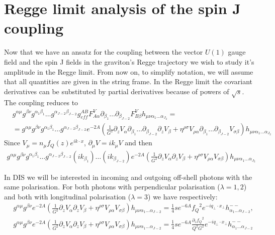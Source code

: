 \documentclass[a4paper,12pt]{article}
\begin{document}
\section{Regge limit analysis of the spin J coupling}
Now that we have an ansatz for the coupling between the vector $U(1)$ gauge field and the spin J fields in the graviton's Regge trajectory we wish to study it's amplitude in the Regge limit. From now on, to simplify notation, we will assume that all quantities are given in the string frame. In the Regge limit the covariant derivatives can be substituted by partial derivatives because of powers of $\sqrt{s}$. The coupling reduces to
\begin{align}
&g^{\alpha \mu} g^{\beta \nu} g^{\alpha_1 \beta_1} \dots g^{\alpha_{J-2} \beta_{J-2}} g^{AB}_{eff} F^{V}_{A \alpha} \partial_{\beta_1} \dots \partial_{\beta_{J-2}} F^{V}_{B \beta} h_{\mu \nu \alpha_1 \dots \alpha_{J_2}} = \\
& = g^{\alpha \mu} g^{\beta \nu} g^{\alpha_1 \beta_1} \dots g^{\alpha_{J-2} \beta_{J-2}} e^{-2A} \left( \frac{1}{G^2} \partial_z V_\alpha \partial_{\beta_1} \dots \partial_{\beta_{J-2}} \partial_z V_\beta + \eta^{\rho \sigma} V_{\rho \alpha} \partial_{\beta_1} \dots \partial_{\beta_{J-2}} V_{\sigma \beta} \right) h_{\mu \nu \alpha_1 \dots \alpha_{J_2}}
\end{align}
Since $V_\mu = n_\mu f_Q \left( z\right) e^{i k \cdot x}$, $\partial_\mu V = i k_\mu V$ and then
\begin{align}
g^{\alpha \mu} g^{\beta \nu} g^{\alpha_1 \beta_1} \dots g^{\alpha_{J-2} \beta_{J-2}} \left( i k_{\beta_1}\right) \dots  \left( i k_{\beta_{J-2}}\right) e^{-2A} \left( \frac{1}{G^2} \partial_z V_\alpha  \partial_z V_\beta + \eta^{\rho \sigma} V_{\rho \alpha} V_{\sigma \beta} \right) h_{\mu \nu \alpha_1 \dots \alpha_{J_2}}
\end{align}

In DIS we will be interested in incoming and outgoing  off-shell photons with the same polarisation. For both photons with perpendicular polarisation ($\lambda = 1, 2$) and both with longitudinal polarisation ($\lambda = 3$) we have respectively:
\begin{align}
&g^{\alpha \mu} g^{\beta \nu} e^{-2 A} \left( \frac{1}{G^2} \partial_z V_\alpha \partial_z V_\beta + \eta^{\rho \sigma} V_{\rho \alpha} V_{\sigma \beta} \right) h_{\mu \nu \alpha_1 \dots \alpha_{J-2}} = \frac{1}{4} s e^{-6A} {f_Q}^2 e^{-i q_\perp \cdot x_\perp} h^{--}_{\alpha_1 \dots \alpha_{J-2}}, \\
&g^{\alpha \mu} g^{\beta \nu} e^{-2 A} \left( \frac{1}{G^2} \partial_z V_\alpha \partial_z V_\beta + \eta^{\rho \sigma} V_{\rho \alpha} V_{\sigma \beta} \right) h_{\mu \nu \alpha_1 \dots \alpha_{J-2}} = \frac{1}{4} s e^{-6A} \frac{{\partial_z f_Q}^2}{Q^2 G^2} e^{-i q_\perp \cdot x_\perp} h^{--}_{\alpha_1 \dots \alpha_{J-2}}
\end{align}
\end{document}
